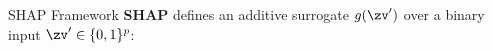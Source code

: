 \documentclass[10pt,compress,t,notes=noshow, xcolor=table]{beamer}
\begin{document}
\begin{framev}[align=top]{SHAP Framework }
\textbf{SHAP}
defines an additive surrogate $g(\zv')$ over a binary input $\zv' \in \{0,1\}^p$:





\end{framev}
\end{document}

